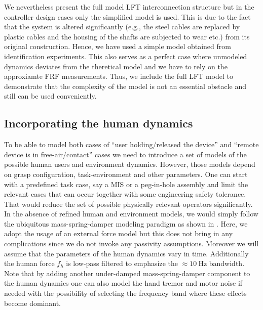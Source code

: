 We nevertheless present the full model LFT interconnection structure but in the controller design cases only the simplified 
model is used. This is due to the fact that the system is altered significantly (e.g., the steel cables are replaced by plastic 
cables and the housing of the shafts are subjected to wear etc.) from its original construction. Hence, we have
used a simple model obtained from identification experiments. This also serves as a perfect case where unmodeled dynamics 
deviates from the theretical model and we have to rely on the approxiamte FRF measurements. Thus, we include the full LFT 
model to demonstrate that the complexity of the model is not an essential obstacle and still can be used conveniently.



\subsection{Incorporating the human dynamics}
To be able to model both cases of \enquote{user holding/released the device} and \enquote{remote device is in free-air/contact} 
cases we need to introduce a set of models of the possible human users and environment dynamics. However, those models depend on
grasp configuration, task-environment and other parameters. One can start with a predefined task case, say a MIS or a peg-in-hole 
assembly and limit the relevant cases that can occur together with some engineering safety tolerance. That would reduce the 
set of possible physically relevant operators significantly. In the absence of refined human and environment models, we would simply
follow the ubiquitous mass-spring-damper modeling paradigm as shown in . Here, we adopt the usage of an
external force model but this does not bring in any complications since we do not invoke any passivity assumptions. Moreover
we will assume that the parameters of the human dynamics vary in time. Additionally the human force $f_h$ is low-pass filtered to 
emphasize the $\approx \SI{10}{\hertz}$ bandwidth. 
Note that by adding another under-damped mass-spring-damper component to the human dynamics one can also model the hand tremor 
and motor noise if needed with the possibility of selecting the frequency band where these effects become dominant. 


